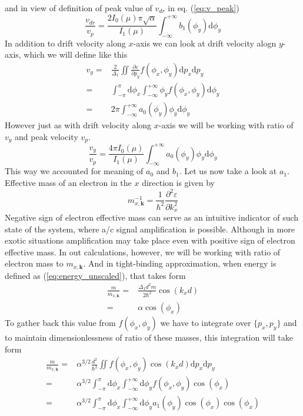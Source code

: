\documentclass[40pt,letterpaper,physrev]{article}
\begin{document}
	and in view of definition of peak value of $v_{dr}$ in eq. (\ref{eq:v_peak})
	\begin{equation}
	\boxed{
		\frac{v_{dr}}{v_p}=\frac{2I_0(\mu)\pi\sqrt{\alpha}}{I_1(\mu)}
			\int^{+\infty}_{-\infty}b_1(\phi_y)\text{d}\phi_y
			}
	\end{equation}
	In addition to drift velocity along $x$-axis we can look at drift velocity alogn $y$-axis, which we will define like this
	\begin{align}
	v_y=&\frac{2}{\Delta_1}\iint\frac{\partial\varepsilon}{\partial p_y}f(\phi_x,\phi_y)\text{d}p_x\text{d}p_y \\
	=&\int^{\pi}_{-\pi}\text{d}\phi_x\int^{+\infty}_{-\infty} \phi_y f(\phi_x,\phi_y) \text{d}\phi_y \\
	=&2\pi\int^{+\infty}_{-\infty}a_0(\phi_y)\phi_y\text{d}\phi_y
	\end{align}
	However just as with drift velocity along $x$-axis we will be working with ratio of $v_y$ and peak velocity $v_p$.
	\begin{equation}
	\boxed{
	\frac{v_y}{v_p}=\frac{4\pi I_0(\mu)}{I_1(\mu)}\int^{+\infty}_{-\infty}a_0(\phi_y)\phi_y\text{d}\phi_y
	}
	\end{equation}
	This way we accounted for meaning of $a_0$ and $b_1$. Let us now take a look at $a_1$. Effective mass of an electron in the $x$ direction is given by 
	\begin{equation}
		m^{-1}_{x,\mathbf{k}}=\frac{1}{\hbar^2}\frac{\partial^2\varepsilon}{\partial k^2_x}
	\end{equation}
	Negative sign of electron effective mass can serve as an intuitive indicator of such state of the system,
	where a/c signal amplification is possible. Although in more exotic situations amplification may take place
	even with positive sign of electron effective mass. In out calculations, however, we will be working with
	ratio of electron mass to $m_{x,\mathbf{k}}$. And in tight-binding approximation, when 
	energy is defined as (\ref{eq:energy_unscaled}), that takes form
	\begin{align}
	\frac{m}{m_{x,\mathbf{k}}}=&\frac{\Delta_1 d^2m}{2\hbar^2}\cos(k_xd) \\
	=&\alpha\cos(\phi_x)
	\end{align}
	To gather back this value from $f(\phi_x,\phi_y)$ we have to integrate over $\{p_x,p_y\}$ and to maintain dimensionlessness of ratio of these masses, this integration will take form
	\begin{align}
	\frac{m}{m_{x,\mathbf{k}}}=&\alpha^{3/2}\frac{d^2}{\hbar^2}\iint f(\phi_x, \phi_y)\cos(k_{x}d)\text{d}p_x\text{d}p_y \\
	=&\alpha^{3/2}\int^{\pi}_{-\pi}\text{d}\phi_x\int^{+\infty}_{-\infty}\text{d}\phi_y f(\phi_x, \phi_y)\cos(\phi_x) \\
	=&\alpha^{3/2}\int^{\pi}_{-\pi}\text{d}\phi_x\int^{+\infty}_{-\infty}\text{d}\phi_y a_1(\phi_y)\cos(\phi_x)\cos(\phi_x)
	\end{align}
\end{document}
